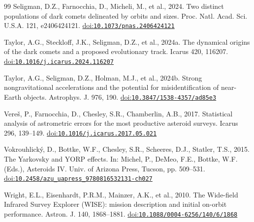 \documentclass[3p,11pt]{elsarticle}
\begin{document}
\begin{thebibliography}{99}
Seligman, D.Z., Farnocchia, D., Micheli, M., et al., 2024. Two distinct populations of dark
comets delineated by orbits and sizes. Proc. Natl. Acad. Sci. U.S.A. 121, e2406424121.
\href{https://doi.org/10.1073/pnas.2406424121}{doi:\nolinkurl{10.1073/pnas.2406424121}}

Taylor, A.G., Steckloff, J.K., Seligman, D.Z., et al., 2024a. The dynamical origins of the dark
comets and a proposed evolutionary track. Icarus 420, 116207.
\href{https://doi.org/10.1016/j.icarus.2024.116207}{doi:\nolinkurl{10.1016/j.icarus.2024.116207}}

Taylor, A.G., Seligman, D.Z., Holman, M.J., et al., 2024b. Strong nongravitational
accelerations and the potential for misidentification of near-Earth objects. Astrophys. J.
976, 190. \href{https://doi.org/10.3847/1538-4357/ad85e3}{doi:\nolinkurl{10.3847/1538-4357/ad85e3}}

Vere{\v{s}}, P., Farnocchia, D., Chesley, S.R., Chamberlin, A.B., 2017. Statistical analysis
of astrometric errors for the most productive asteroid surveys. Icarus 296, 139--149.
\href{https://doi.org/10.1016/j.icarus.2017.05.021}{doi:\nolinkurl{10.1016/j.icarus.2017.05.021}}

Vokrouhlick{\'y}, D., Bottke, W.F., Chesley, S.R., Scheeres, D.J., Statler, T.S., 2015. The
Yarkovsky and YORP effects. In: Michel, P., DeMeo, F.E., Bottke, W.F. (Eds.), Asteroids IV.
Univ. of Arizona Press, Tucson, pp. 509--531.
\href{https://doi.org/10.2458/azu_uapress_9780816532131-ch027}{doi:\nolinkurl{10.2458/azu_uapress_9780816532131-ch027}}

Wright, E.L., Eisenhardt, P.R.M., Mainzer, A.K., et al., 2010. The Wide-field Infrared Survey
Explorer (WISE): mission description and initial on-orbit performance. Astron. J. 140,
1868--1881. \href{https://doi.org/10.1088/0004-6256/140/6/1868}{doi:\nolinkurl{10.1088/0004-6256/140/6/1868}}

\end{thebibliography}
\end{document}
